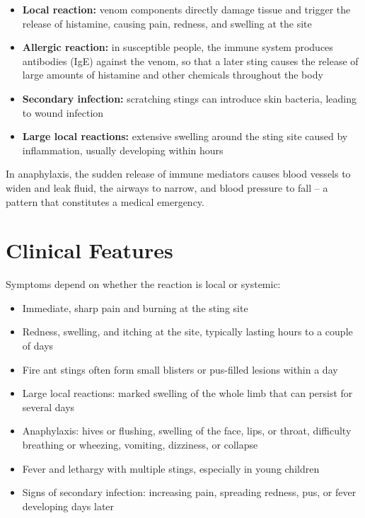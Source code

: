 \begin{itemize}
    \item \textbf{Local reaction:} venom components directly damage tissue and trigger the release of histamine, causing pain, redness, and swelling at the site
    \item \textbf{Allergic reaction:} in susceptible people, the immune system produces antibodies (IgE) against the venom, so that a later sting causes the release of large amounts of histamine and other chemicals throughout the body
    \item \textbf{Secondary infection:} scratching stings can introduce skin bacteria, leading to wound infection
    \item \textbf{Large local reactions:} extensive swelling around the sting site caused by inflammation, usually developing within hours
\end{itemize}

In anaphylaxis, the sudden release of immune mediators causes blood vessels to widen and leak fluid, the airways to narrow, and blood pressure to fall -- a pattern that constitutes a medical emergency.

\section*{Clinical Features}
Symptoms depend on whether the reaction is local or systemic:

\begin{itemize}
    \item Immediate, sharp pain and burning at the sting site
    \item Redness, swelling, and itching at the site, typically lasting hours to a couple of days
    \item Fire ant stings often form small blisters or pus-filled lesions within a day
    \item Large local reactions: marked swelling of the whole limb that can persist for several days
    \item Anaphylaxis: hives or flushing, swelling of the face, lips, or throat, difficulty breathing or wheezing, vomiting, dizziness, or collapse
    \item Fever and lethargy with multiple stings, especially in young children
    \item Signs of secondary infection: increasing pain, spreading redness, pus, or fever developing days later
\end{itemize}

